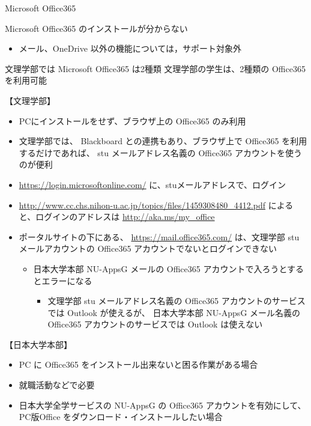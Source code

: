 \documentclass[a4j,10pt]{jsarticle}
\begin{document}
{\begin{frame}[label={sec:org6e73ec1},fragile]{Microsoft Office365}
\begin{block}{Microsoft Office365 のインストールが分からない}
\begin{enumerate}
\begin{itemize}
\item メール、OneDrive 以外の機能については，サポート対象外
\end{itemize}
\end{enumerate}
\end{block}
\par
\begin{block}{文理学部では Microsoft Office365 は2種類}
文理学部の学生は、2種類の Office365 を利用可能
\par
\begin{block}{【文理学部】}
\begin{itemize}
\item PCにインストールをせず、ブラウザ上の Office365 のみ利用
\item 文理学部では、 Blackboard との連携もあり、ブラウザ上で Office365 を利用するだけであれば、
stu メールアドレス名義の Office365 アカウントを使うのが便利
\par
\item \url{https://login.microsoftonline.com/} に、stuメールアドレスで、ログイン
\item \url{http://www.cc.chs.nihon-u.ac.jp/topics/files/1459308480\_4412.pdf}
によると、ログインのアドレスは \url{http://aka.ms/my\_office}
\par
\item ポータルサイトの下にある、
\url{https://mail.office365.com/}
は、文理学部 stuメールアカウントの Office365 アカウントでないとログインできない
\begin{itemize}
\item 日本大学本部 NU-AppsG メールの Office365 アカウントで入ろうとするとエラーになる
\begin{itemize}
\item 文理学部 stu メールアドレス名義の Office365 アカウントのサービスでは Outlook が使えるが、
日本大学本部 NU-AppsG メール名義の Office365 アカウントのサービスでは Outlook は使えない
\end{itemize}
\end{itemize}
\end{itemize}
\end{block}
\par
\begin{block}{【日本大学本部】}
\begin{itemize}
\item PC に Office365 をインストール出来ないと困る作業がある場合
\item 就職活動などで必要
\item 日本大学全学サービスの NU-AppsG の Office365 アカウントを有効にして、PC版Office をダウンロード・インストールしたい場合

\end{itemize}
\end{block}
\end{block}
\end{frame}}
\end{document}
